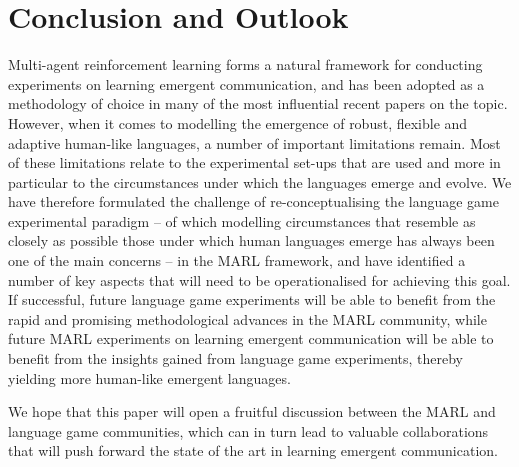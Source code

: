 \documentclass[a4paper,abstract]{scrartcl}
\begin{document}
\section{Conclusion and Outlook}

Multi-agent reinforcement learning forms a natural framework for conducting experiments on learning emergent communication, and has been adopted as a methodology of choice in many of the most influential recent papers on the topic. However, when it comes to modelling the emergence of robust, flexible and adaptive human-like languages, a number of important limitations remain. Most of these limitations relate to the experimental set-ups that are used and more in particular to the circumstances under which the languages emerge and evolve. We have therefore formulated the challenge of re-conceptualising the language game experimental paradigm -- of which modelling circumstances that resemble as closely as possible those under which human languages emerge has always been one of the main concerns --  in the MARL framework, and have identified a number of key aspects that will need to be operationalised for achieving this goal. If successful, future language game experiments will be able to benefit from the rapid and promising methodological advances in the MARL community, while future MARL experiments on learning emergent communication will  be able  to benefit from the insights gained from language game experiments, thereby yielding more human-like emergent languages.

We hope that this paper will open a fruitful discussion between the MARL and language game communities, which can in turn lead to valuable collaborations that will push forward the state of the art in learning emergent communication.

\setlength{\bibsep}{1pt plus 0.3ex}


\end{document}
